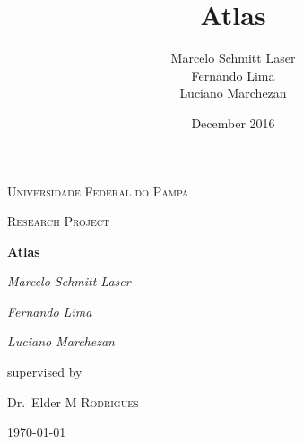 \documentclass{report}
\title{Atlas}
\author{Marcelo Schmitt Laser\\Fernando Lima\\Luciano Marchezan}
\date{December 2016}
\begin{document}

\begin{titlepage}
	\centering
	\par\vspace{3cm}
	{\scshape\LARGE Universidade Federal do Pampa \par}
	\vspace{1cm}
	{\scshape\Large Research Project\par}
	\vspace{1.5cm}
	{\huge\bfseries Atlas\par}
	\vspace{2cm}
	{\Large\itshape Marcelo Schmitt Laser\par}
	{\Large\itshape Fernando Lima\par}
	{\Large\itshape Luciano Marchezan\par}
	\vfill
	supervised by\par
	Dr.~Elder M \textsc{Rodrigues}

	\vfill

	{\large \today\par}
\end{titlepage}



\tableofcontents










\end{document}
